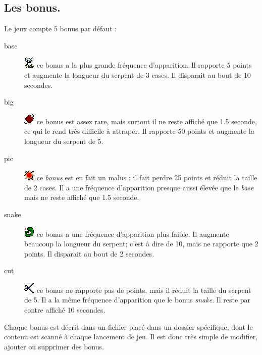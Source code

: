 \documentclass{article}
\begin{document}
\subsection{Les bonus.} \label{bonus}
Le jeux compte 5 bonus par défaut :\begin{description}
	\item[base] \includegraphics{img/base.png} ce bonus a la plus grande fréquence d'apparition. Il rapporte 5 points et augmente la longueur du serpent de 3 cases. Il disparait au bout de 10 secondes.
	\item[big]  \includegraphics{img/big.png} ce bonus est assez rare, mais surtout il ne reste affiché que 1.5 seconde, ce qui le rend très difficile à attraper. Il rapporte 50 points et augmente la longueur du serpent de 5.
	\item[pic]  \includegraphics{img/pic.png} ce \emph{bonus} est en fait un malus : il fait perdre 25 points et réduit la taille de 2 cases. Il a une fréquence d'apparition presque aussi élevée que le \emph{base} mais ne reste affiché que 1.5 seconde.
	\item[snake]  \includegraphics{img/snake.png} ce bonus a une fréquence d'apparition plus faible. Il augmente beaucoup la longueur du serpent; c'est à dire de 10, mais ne rapporte que 2 points. Il disparait au bout de 2 secondes.
	\item[cut]  \includegraphics{img/cut.png} ce bonus ne rapporte pas de points, mais il réduit la taille du serpent de 5. Il a la même fréquence d'apparition que le bonus \emph{snake}. Il reste par contre affiché 10 secondes.
\end{description}

Chaque bonus est décrit dans un fichier placé dans un dossier spécifique, dont le contenu est scanné à chaque lancement de jeu. Il est donc très simple de modifier, ajouter ou supprimer des bonus.
\end{document}
